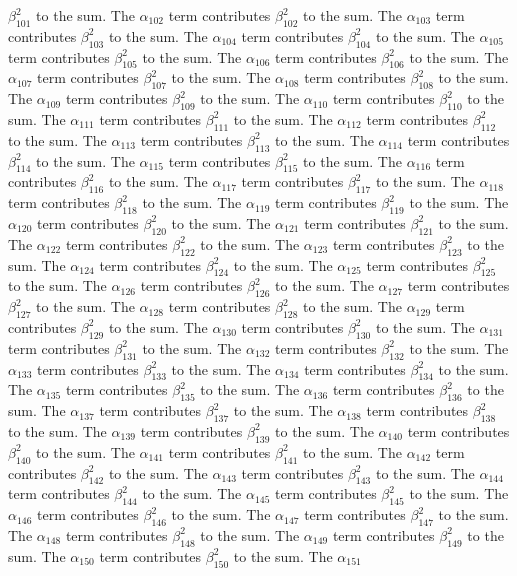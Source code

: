 \begin{lemma}
$\beta_{101}^{2}$ to the sum. The $\alpha_{102}$ term contributes $\beta_{102}^{2}$ to the sum. The $\alpha_{103}$ term contributes $\beta_{103}^{2}$ to the sum. The $\alpha_{104}$ term contributes $\beta_{104}^{2}$ to the sum. The $\alpha_{105}$ term contributes $\beta_{105}^{2}$ to the sum. The $\alpha_{106}$ term contributes $\beta_{106}^{2}$ to the sum. The $\alpha_{107}$ term contributes $\beta_{107}^{2}$ to the sum. The $\alpha_{108}$ term contributes $\beta_{108}^{2}$ to the sum. The $\alpha_{109}$ term contributes $\beta_{109}^{2}$ to the sum. The $\alpha_{110}$ term contributes $\beta_{110}^{2}$ to the sum. The $\alpha_{111}$ term contributes $\beta_{111}^{2}$ to the sum. The $\alpha_{112}$ term contributes $\beta_{112}^{2}$ to the sum. The $\alpha_{113}$ term contributes $\beta_{113}^{2}$ to the sum. The $\alpha_{114}$ term contributes $\beta_{114}^{2}$ to the sum. The $\alpha_{115}$ term contributes $\beta_{115}^{2}$ to the sum. The $\alpha_{116}$ term contributes $\beta_{116}^{2}$ to the sum. The $\alpha_{117}$ term contributes $\beta_{117}^{2}$ to the sum. The $\alpha_{118}$ term contributes $\beta_{118}^{2}$ to the sum. The $\alpha_{119}$ term contributes $\beta_{119}^{2}$ to the sum. The $\alpha_{120}$ term contributes $\beta_{120}^{2}$ to the sum. The $\alpha_{121}$ term contributes $\beta_{121}^{2}$ to the sum. The $\alpha_{122}$ term contributes $\beta_{122}^{2}$ to the sum. The $\alpha_{123}$ term contributes $\beta_{123}^{2}$ to the sum. The $\alpha_{124}$ term contributes $\beta_{124}^{2}$ to the sum. The $\alpha_{125}$ term contributes $\beta_{125}^{2}$ to the sum. The $\alpha_{126}$ term contributes $\beta_{126}^{2}$ to the sum. The $\alpha_{127}$ term contributes $\beta_{127}^{2}$ to the sum. The $\alpha_{128}$ term contributes $\beta_{128}^{2}$ to the sum. The $\alpha_{129}$ term contributes $\beta_{129}^{2}$ to the sum. The $\alpha_{130}$ term contributes $\beta_{130}^{2}$ to the sum. The $\alpha_{131}$ term contributes $\beta_{131}^{2}$ to the sum. The $\alpha_{132}$ term contributes $\beta_{132}^{2}$ to the sum. The $\alpha_{133}$ term contributes $\beta_{133}^{2}$ to the sum. The $\alpha_{134}$ term contributes $\beta_{134}^{2}$ to the sum. The $\alpha_{135}$ term contributes $\beta_{135}^{2}$ to the sum. The $\alpha_{136}$ term contributes $\beta_{136}^{2}$ to the sum. The $\alpha_{137}$ term contributes $\beta_{137}^{2}$ to the sum. The $\alpha_{138}$ term contributes $\beta_{138}^{2}$ to the sum. The $\alpha_{139}$ term contributes $\beta_{139}^{2}$ to the sum. The $\alpha_{140}$ term contributes $\beta_{140}^{2}$ to the sum. The $\alpha_{141}$ term contributes $\beta_{141}^{2}$ to the sum. The $\alpha_{142}$ term contributes $\beta_{142}^{2}$ to the sum. The $\alpha_{143}$ term contributes $\beta_{143}^{2}$ to the sum. The $\alpha_{144}$ term contributes $\beta_{144}^{2}$ to the sum. The $\alpha_{145}$ term contributes $\beta_{145}^{2}$ to the sum. The $\alpha_{146}$ term contributes $\beta_{146}^{2}$ to the sum. The $\alpha_{147}$ term contributes $\beta_{147}^{2}$ to the sum. The $\alpha_{148}$ term contributes $\beta_{148}^{2}$ to the sum. The $\alpha_{149}$ term contributes $\beta_{149}^{2}$ to the sum. The $\alpha_{150}$ term contributes $\beta_{150}^{2}$ to the sum. The $\alpha_{151}$ 
\end{lemma}
